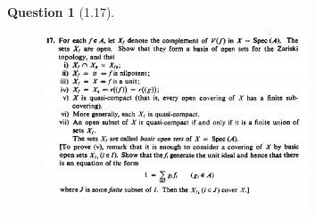 \documentclass[11pt]{article}
\theoremstyle{plain}
\theoremstyle{quest}
\newtheorem*{question}{Question}
\begin{document}
\begin{question}[1.17]
\hfill
\begin{figure}[h!]
  \centering
    \includegraphics[width=0.7\textwidth]{d-1-17.png}
\end{figure}
\end{question}
\end{document}
